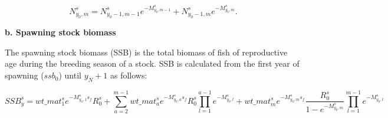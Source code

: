 \documentclass{article}
\begin{document}
\begin{equation}
N^s_{y_0,m}=N^s_{y_0-1,m-1}e^{-M^s_{y_0,m-1}}+N^s_{y_0-1,m}e^{-M^s_{y_0,m}}.
\end{equation}

\hfill

\hfill



\textbf{b. Spawning stock biomass}

The spawning stock biomass (SSB) is the total biomass of fish of reproductive age during the breeding season of a stock. SSB is calculated from the first year of spawning ($ssb_0$) until $y_N+1$ as follows:



\begin{equation}
    SSB^s_y=wt\_{mat}^s_1 e^{-M^s_{y_0,1}s_f} R^s_0 +  
            \sum_{a=2}^{m-1}wt\_{mat}^s_a e^{-M^s_{y_0,a}s_f} R^s_0\prod_{l=1}^{a-1}e^{-M^s_{y_0,l}} + 
            {wt\_mat}^s_{m} e^{-M^s_{y_0,m}s_f} \dfrac{R^s_0}{1-e^{-M^s_{y_0,m}}}\prod_{l=1}^{m-1}e^{-M^s_{y_0,l}}
\end{equation}
  
\end{document}

